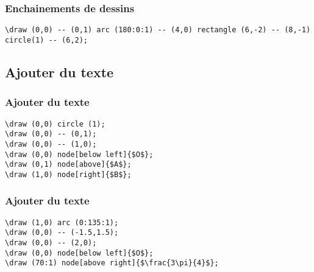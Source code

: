 \documentclass{clic_latex_beamer}
\begin{document}
\begin{frame}[fragile]
\frametitle{Enchainements de dessins}
\centering


\begin{lstlisting}
\draw (0,0) -- (0,1) arc (180:0:1) -- (4,0) rectangle (6,-2) -- (8,-1) circle(1) -- (6,2);
\end{lstlisting}

\end{frame}

\subsection{Ajouter du texte}
\begin{frame}[fragile]
\frametitle{Ajouter du texte}
\centering


\pause

\begin{lstlisting}
\draw (0,0) circle (1);
\draw (0,0) -- (0,1);
\draw (0,0) -- (1,0);
\draw (0,0) node[below left]{$O$};
\draw (0,1) node[above]{$A$};
\draw (1,0) node[right]{$B$};
\end{lstlisting}

\end{frame}

\begin{frame}[fragile]
\frametitle{Ajouter du texte}
\centering


\begin{lstlisting}
\draw (1,0) arc (0:135:1);
\draw (0,0) -- (-1.5,1.5);
\draw (0,0) -- (2,0);
\draw (0,0) node[below left]{$O$};
\draw (70:1) node[above right]{$\frac{3\pi}{4}$};
\end{lstlisting} 

\end{frame}
 
\end{document}
